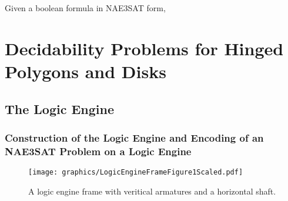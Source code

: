 Given a boolean formula in NAE3SAT form, 

\chapter{Decidability Problems for Hinged Polygons and Disks}
\section{The Logic Engine}
\subsection{Construction of the Logic Engine and Encoding of an NAE3SAT Problem on a Logic 
Engine}



\begin{figure}[!h]
\begin{center}
\texttt{[image: graphics/LogicEngineFrameFigure1Scaled.pdf]}
\caption{A logic engine frame with veritical armatures and a horizontal 
shaft.}\label{fig:LogicEngineFrameFigure1.pdf}
\end{center}
\end{figure}


